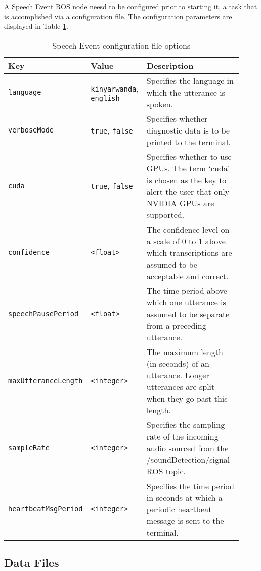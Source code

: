 \documentclass{CSSRforAfrica}
\begin{document}
A Speech Event ROS node neesd to be configured prior to starting it, a task that is accomplished via a configuration file. The configuration parameters are displayed in Table \ref{table:speechEvent-config-file}.

\begin{center}
\begin{table}[thb]
\begin{tabular}[thb]{|p{0.27\linewidth}|p{0.20\linewidth}|p{0.45\linewidth}|}\hline
\rowcolor{lightgray} Key & Value & Description \\ \hline
\texttt{language} & \texttt{kinyarwanda}, \texttt{english} & Specifies the language in which the utterance is spoken. \\ \hline
\texttt{verboseMode} & \texttt{true}, \texttt{false} & Specifies whether diagnostic data is to be printed to the terminal. \\ \hline
\texttt{cuda} & \texttt{true}, \texttt{false} & Specifies whether to use GPUs. The term ‘cuda’ is chosen as the key to alert the user that only NVIDIA GPUs are supported. \\ \hline
\texttt{confidence} & \texttt{<float>} & The confidence level on a scale of 0 to 1 above which transcriptions are assumed to be acceptable and correct. \\ \hline
\texttt{speechPausePeriod} & \texttt{<float>} & The time period above which one utterance is assumed to be separate from a preceding utterance. \\ \hline
\texttt{maxUtteranceLength} & \texttt{<integer>} & The maximum length (in seconds) of an utterance. Longer utterances are split when they go past this length. \\ \hline
\texttt{sampleRate} & \texttt{<integer>} & Specifies the sampling rate of the incoming audio sourced from the /soundDetection/signal ROS topic. \\ \hline
\texttt{heartbeatMsgPeriod} & \texttt{<integer>} & Specifies the time period in seconds at which a periodic heartbeat message is sent to the terminal. \\ \hline
\end{tabular}
\caption{Speech Event configuration file options}
\label{table:speechEvent-config-file}
\end{table}
\end{center}

\subsection{Data Files}
\end{document}
